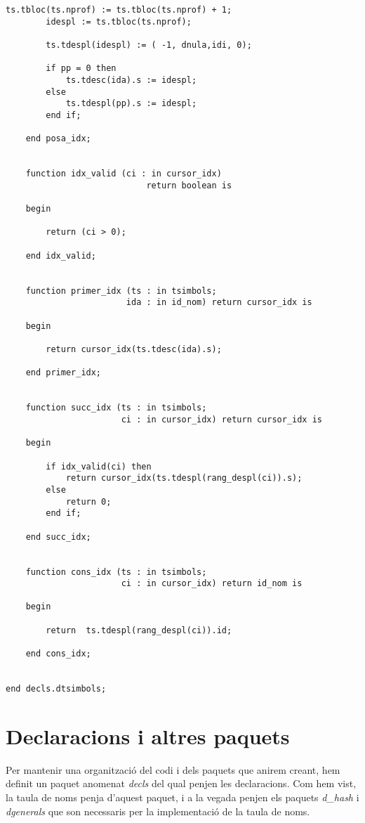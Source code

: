\documentclass[10pt]{report}
\begin{document}
\begin{lstlisting}[style=Ada]
        ts.tbloc(ts.nprof) := ts.tbloc(ts.nprof) + 1;
        idespl := ts.tbloc(ts.nprof);
        
        ts.tdespl(idespl) := ( -1, dnula,idi, 0);
        
        if pp = 0 then
            ts.tdesc(ida).s := idespl;
        else
            ts.tdespl(pp).s := idespl;
        end if;        
    
    end posa_idx;
    
    
    function idx_valid (ci : in cursor_idx) 
                            return boolean is
    
    begin
    
        return (ci > 0);
    
    end idx_valid;
    
    
    function primer_idx (ts : in tsimbols;
                        ida : in id_nom) return cursor_idx is
    
    begin
    
        return cursor_idx(ts.tdesc(ida).s);
    
    end primer_idx;
    
    
    function succ_idx (ts : in tsimbols;
                       ci : in cursor_idx) return cursor_idx is
    
    begin
    
        if idx_valid(ci) then
            return cursor_idx(ts.tdespl(rang_despl(ci)).s);
        else 
            return 0;
        end if;
        
    end succ_idx;
    
    
    function cons_idx (ts : in tsimbols;
                       ci : in cursor_idx) return id_nom is
    
    begin
    
        return  ts.tdespl(rang_despl(ci)).id;
    
    end cons_idx;
    
    
end decls.dtsimbols;
    \end{lstlisting}
    \newpage
   
    
    
    
    \chapter{Declaracions i altres paquets}
        Per mantenir una organització del codi i dels paquets que anirem creant, hem definit un paquet anomenat \textit{decls} del qual penjen les declaracions. Com hem vist, la taula de noms penja d'aquest paquet, i a la vegada penjen els paquets \textit{d\_hash} i \textit{dgenerals} que son necessaris per la implementació de la taula de noms.
        \\
        
\end{document}
